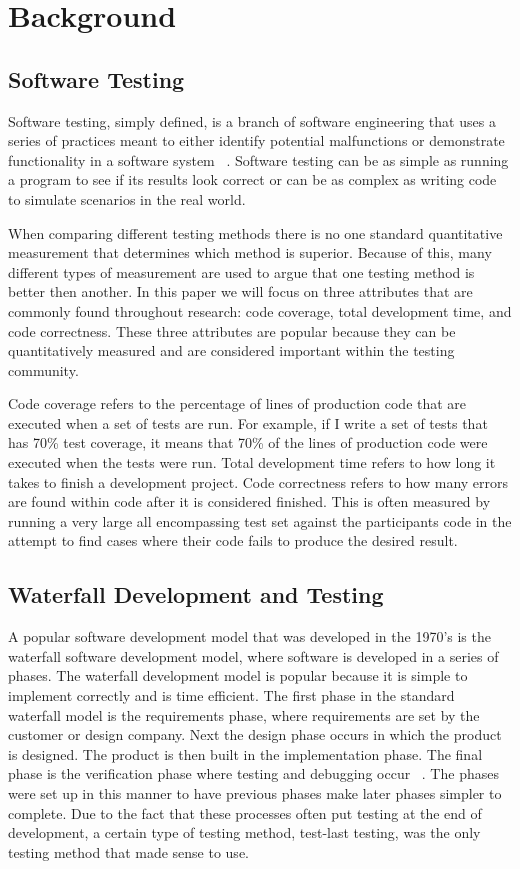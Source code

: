 \documentclass{sig-alternate}
\begin{document}
\section{Background}
\subsection{Software Testing}
Software testing, simply defined, is a branch of software engineering that uses a series of practices meant to either identify potential malfunctions or demonstrate functionality in a software system ~\cite{Bertolino:2007}.  Software testing can be as simple as running a program to see if its results look correct or can be as complex as writing code to simulate scenarios in the real world.

When comparing different testing methods there is no one standard quantitative measurement that determines which method is superior.  Because of this, many different types of measurement are used to argue that one testing method is better then another.  In this paper we will focus on three attributes that are commonly found throughout research: code coverage, total development time, and code correctness.   These three attributes are popular because they can be quantitatively measured and are considered important within the testing community.

Code coverage refers to the percentage of lines of production code that are executed when a set of tests are run. For example, if I write a set of tests that has 70\% test coverage, it means that 70\% of the lines of production code were executed when the tests were run.  Total development time refers to how long it takes to finish a development project.  Code correctness refers to how many errors are found within code after it is considered finished.  This is often measured by running a very large all encompassing test set against the participants code in the attempt to find cases where their code fails to produce the desired result. 

\subsection{Waterfall Development and Testing}

A popular software development model that was developed in the 1970's is the waterfall software development model, where software is developed in a series of phases.  The waterfall development model is popular because it is simple to implement correctly and is time efficient. The first phase in the standard waterfall model is the requirements phase, where requirements are set by the customer or design company.  Next the design phase occurs in which the product is designed. The product is then built in the implementation phase.  The final phase is the verification phase where testing and debugging occur ~\cite{wiki:xxx}.  The phases were set up in this manner to have previous phases make later phases simpler to complete.  Due to the fact that these processes often put testing at the end of development, a certain type of testing method, test-last testing, was the only testing method that made sense to use.
\end{document}

